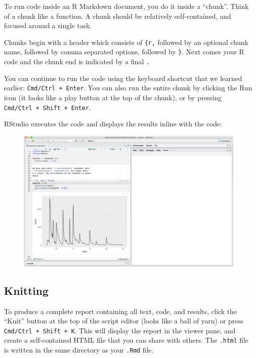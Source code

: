 \documentclass[]{book}
\begin{document}
To run code inside an R Markdown document, you do it inside a ``chunk''.
Think of a chunk like a function. A chunk should be relatively
self-contained, and focused around a single task.

Chunks begin with a header which consists of
\texttt{\textasciigrave{}\textasciigrave{}\textasciigrave{}\{r,}
followed by an optional chunk name, followed by comma separated options,
followed by \texttt{\}}. Next comes your R code and the chunk end is
indicated by a final
\texttt{\textasciigrave{}\textasciigrave{}\textasciigrave{}.}

You can continue to run the code using the keyboard shortcut that we
learned earlier: \texttt{Cmd/Ctrl\ +\ Enter}. You can also run the
entire chunk by clicking the Run icon (it looks like a play button at
the top of the chunk), or by pressing
\texttt{Cmd/Ctrl\ +\ Shift\ +\ Enter}.

RStudio executes the code and displays the results inline with the code:

\begin{figure}
\centering
\includegraphics{img/r-markdown.png}
\caption{}
\end{figure}

\subsection{Knitting}\label{knitting}

To produce a complete report containing all text, code, and results,
click the ``Knit'' button at the top of the script editor (looks like a
ball of yarn) or press \texttt{Cmd/Ctrl\ +\ Shift\ +\ K}. This will
display the report in the viewer pane, and create a self-contained HTML
file that you can share with others. The \texttt{.html} file is written
in the same directory as your \texttt{.Rmd} file.
\end{document}

